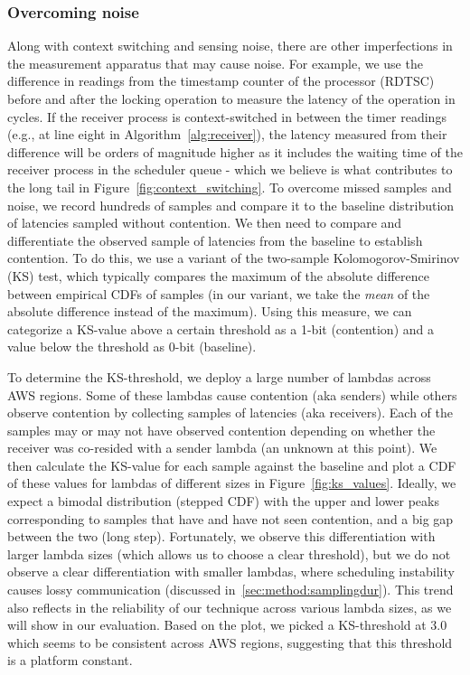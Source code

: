 \subsubsection{Overcoming noise} 
\label{sec:method:noise}
Along with context switching and sensing noise, there are other imperfections in
the measurement apparatus that may cause noise. For example, we use the
difference in readings from the timestamp counter of the processor (RDTSC)
before and after the locking operation to measure the latency of the operation
in cycles. If the receiver process is context-switched in between the timer
readings (e.g., at line eight in Algorithm~\ref{alg:receiver}), the latency
measured from their difference will be orders of magnitude higher as it includes
the waiting time of the receiver process in the scheduler queue - which we
believe is what contributes to the long tail in
Figure~\ref{fig:context_switching}. To overcome missed samples and noise, we
record hundreds of samples and compare it to the baseline distribution of
latencies sampled without contention. We then need to compare and differentiate
the observed sample of latencies from the baseline to establish contention. To
do this, we use a variant of the two-sample Kolomogorov-Smirinov (KS) test,
which typically compares the maximum of the absolute difference between
empirical CDFs of samples (in our variant, we take the \emph{mean} of the
absolute difference instead of the maximum). Using this
measure, we can categorize a KS-value above a certain threshold as a 1-bit
(contention) and a value below the threshold as 0-bit (baseline).

To determine the KS-threshold, we deploy a large number of lambdas across AWS
regions. Some of these lambdas cause contention (aka senders) while others
observe contention by collecting samples of latencies (aka receivers). Each of
the samples may or may not have observed contention depending on whether the
receiver was co-resided with a sender lambda (an unknown at this point). We then
calculate the KS-value for each sample against the baseline and plot a CDF of
these values for lambdas of different sizes in Figure~\ref{fig:ks_values}.
Ideally, we expect a bimodal distribution (stepped CDF) with the upper and
lower peaks corresponding to samples that have and have not seen contention, and
a big gap between the two (long step). Fortunately, we observe this
differentiation with larger lambda sizes (which allows us to choose a clear
threshold), but we do not observe a clear differentiation with smaller lambdas,
where scheduling instability causes lossy communication (discussed
in~\ref{sec:method:samplingdur}).  This trend also reflects in the reliability
of our technique across various lambda sizes, as we will show in our evaluation.
Based on the plot, we picked a KS-threshold at 3.0 which seems to be consistent
across AWS regions, suggesting that this threshold is a platform constant.

